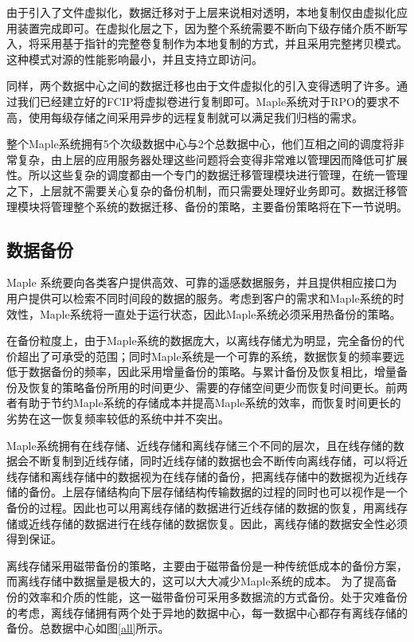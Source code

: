 \documentclass{article}
\begin{document}
由于引入了文件虚拟化，数据迁移对于上层来说相对透明，本地复制仅由虚拟化应用装置完成即可。在虚拟化层之下，因为整个系统需要不断向下级存储介质不断写入，将采用基于指针的完整卷复制作为本地复制的方式，并且采用完整拷贝模式。这种模式对源的性能影响最小，并且支持立即访问。

同样，两个数据中心之间的数据迁移也由于文件虚拟化的引入变得透明了许多。通过我们已经建立好的FCIP将虚拟卷进行复制即可。Maple系统对于RPO的要求不高，使用每级存储之间采用异步的远程复制就可以满足我们归档的需求。

整个Maple系统拥有5个次级数据中心与2个总数据中心，他们互相之间的调度将非常复杂，由上层的应用服务器处理这些问题将会变得非常难以管理因而降低可扩展性。所以这些复杂的调度都由一个专门的数据迁移管理模块进行管理，在统一管理之下，上层就不需要关心复杂的备份机制，而只需要处理好业务即可。数据迁移管理模块将管理整个系统的数据迁移、备份的策略，主要备份策略将在下一节说明。

\subsection{数据备份}
Maple 系统要向各类客户提供高效、可靠的遥感数据服务，并且提供相应接口为用户提供可以检索不同时间段的数据的服务。考虑到客户的需求和Maple系统的时效性，Maple系统将一直处于运行状态，因此Maple系统必须采用热备份的策略。

在备份粒度上，由于Maple系统的数据庞大，以离线存储尤为明显，完全备份的代价超出了可承受的范围；同时Maple系统是一个可靠的系统，数据恢复的频率要远低于数据备份的频率，因此采用增量备份的策略。与累计备份及恢复相比，增量备份及恢复的策略备份所用的时间更少、需要的存储空间更少而恢复时间更长。前两者有助于节约Maple系统的存储成本并提高Maple系统的效率，而恢复时间更长的劣势在这一恢复频率较低的系统中并不突出。

Maple系统拥有在线存储、近线存储和离线存储三个不同的层次，且在线存储的数据会不断复制到近线存储，同时近线存储的数据也会不断传向离线存储，可以将近线存储和离线存储中的数据视为在线存储的备份，把离线存储中的数据视为近线存储的备份。上层存储结构向下层存储结构传输数据的过程的同时也可以视作是一个备份的过程。因此也可以用离线存储的数据进行近线存储的数据的恢复，用离线存储或近线存储的数据进行在线存储的数据恢复。因此，离线存储的数据安全性必须得到保证。

离线存储采用磁带备份的策略，主要由于磁带备份是一种传统低成本的备份方案，而离线存储中数据量是极大的，这可以大大减少Maple系统的成本。 为了提高备份的效率和介质的性能，这一磁带备份可采用多数据流的方式备份。处于灾难备份的考虑，离线存储拥有两个处于异地的数据中心，每一数据中心都存有离线存储的备份。总数据中心如图\ref{all}所示。
\end{document}
